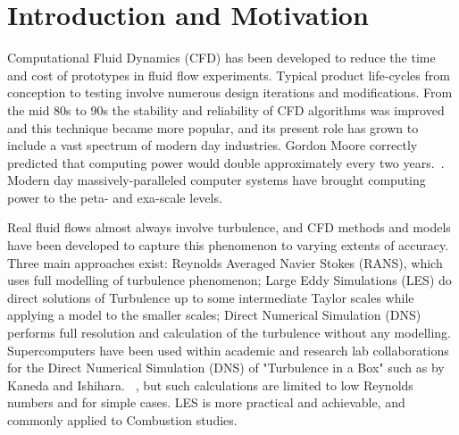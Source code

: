 \documentclass[titlepage,11pt,letterpaper]{article}
\begin{document}
\thispagestyle{empty}\titleRR
\clearpage
\setcounter{page}{1}


\newpage
\section{Introduction and Motivation}

Computational Fluid Dynamics (CFD) has been developed to reduce the time and cost of prototypes in fluid flow experiments. Typical product life-cycles from conception to testing involve numerous design iterations and modifications. From the mid 80s to 90s the stability and reliability of CFD algorithms was improved and this technique became more popular, and its present role has grown to include a vast spectrum of modern day industries. Gordon Moore correctly predicted that computing power would double approximately every two years.~\cite{intel:2005}. Modern day massively-paralleled computer systems have brought computing power to the peta- and exa-scale levels.\par

Real fluid flows almost always involve turbulence, and CFD methods and models have been developed to capture this phenomenon to varying extents of accuracy. Three main approaches exist: Reynolds Averaged Navier Stokes (RANS), which uses full modelling of turbulence phenomenon; Large Eddy Simulations (LES) do direct solutions of Turbulence up to some intermediate Taylor scales while applying a model to the smaller scales; Direct Numerical Simulation (DNS) performs full resolution and calculation of the turbulence without any modelling. Supercomputers have been used within academic and research lab collaborations for the Direct Numerical Simulation (DNS) of "Turbulence in a Box" such as by Kaneda and Ishihara. ~\cite{kaneda:2006}, but such calculations are limited to low Reynolds numbers and for simple cases. LES is more practical and achievable, and commonly applied to Combustion studies.\par 
\end{document}
